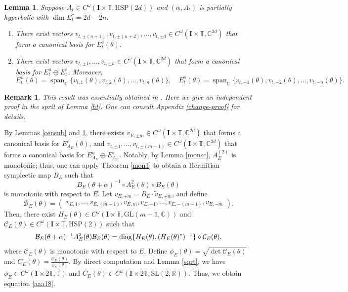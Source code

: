 \documentclass[11pt]{amsart}
\newtheorem{lemma}[theorem]{Lemma}
\newtheorem{rem}[theorem]{Remark}
\theoremstyle{remark}
\theoremstyle{definition}
\newcommand{\I}{{\mathbf I}}
\newcommand{\diag}{{\rm diag}}
\begin{document}
\begin{lemma}\label{change}  
Suppose \(A_t \in C^\omega(\I\times \mathbb{T}, \mathrm{HSP}(2d))\) and \((\alpha, A_t)\) is partially hyperbolic with \(\dim E_t^c = 2d - 2n\).  
\begin{enumerate}  
\item There exist vectors \(v_{t,\pm (n+1)}, v_{t,\pm (n+2)}, \dots, v_{t,\pm d} \in C^\omega(\I \times \mathbb{T}, \mathbb{C}^{2d})\) that form a canonical basis for \(E_t^c(\theta)\).  

\item There exist vectors \(v_{t,\pm 1}, \dots, v_{t,\pm n} \in C^\omega(\I\times \mathbb{T},\mathbb{C}^{2d})\) that form a canonical basis for \(E_t^u \oplus E_t^s\). Moreover,  
\[  
E_t^u(\theta) = \operatorname{span}_{\mathbb{C}}\{v_{t,1}(\theta), v_{t,2}(\theta), \dots, v_{t,n}(\theta)\}, \quad E_t^s(\theta) = \operatorname{span}_{\mathbb{C}}\{v_{t,-1}(\theta), v_{t,-2}(\theta), \dots, v_{t,-n}(\theta)\}.  
\]  
\end{enumerate}  
\end{lemma}
   

\begin{rem}
    This result was essentially obtained in  \cite[Proposition 5.2]{WXZ}. Here we give an independent proof in the sprit of Lemma \ref{ht}. One can consult Appendix \ref{change-proof} for details. 
\end{rem}

By Lemmas \ref{censub} and \ref{change}, there exists $\tilde{v}_{E,\pm m} \in C^\omega(\I \times \mathbb{T}, \mathbb{C}^{2d})$ that forms a canonical basis for $E_{A_E}^c(\theta)$, and $v_{t,\pm 1}, \dots, v_{t,\pm (m-1)} \in C^\omega(\I \times \mathbb{T}, \mathbb{C}^{2d})$ that forms a canonical basis for $E_{A_E}^u \oplus E_{A_E}^s$. Notably, by Lemma \ref{monsc}, $A_E^{(2)}$ is monotonic; thus, one can apply Theorem \ref{mon1} to obtain a Hermitian-symplectic map $B_E$ such that
$$
B_E(\theta+\alpha)^{-1} \circ A_E^2(\theta) \circ B_E(\theta)
$$
is monotonic with respect to $E$. Let $v_{E,\pm m} = B_E \cdot \tilde{v}_{E,\pm m}$, and define
$$
\mathcal{B}_E(\theta) = \begin{pmatrix}
v_{E, 1}, \dots, v_{E, (m-1)}, v_{E,m}, v_{E, -1}, \dots, v_{E, -(m-1)}, v_{E,-m}
\end{pmatrix}.
$$
Then, there exist $H_E(\theta) \in C^\omega(\I \times \mathbb{T}, \mathrm{GL}(m-1,\mathbb{C}))$ and $\mathcal{C}_E(\theta) \in C^{\omega}(\I \times \mathbb{T}, \mathrm{HSP}(2))$ such that
$$
\mathcal{B}_E(\theta+\alpha)^{-1} A_E^2(\theta) \mathcal{B}_E(\theta) = \diag\{H_E(\theta), (H_E(\theta)^*)^{-1}\} \diamond \mathcal{C}_E(\theta),
$$
where $\mathcal{C}_E(\theta)$ is monotonic with respect to $E$.
Define $\phi_E(\theta) = \sqrt{\det \mathcal{C}_E(\theta)}$ and $C_E(\theta) = \frac{\mathcal{C}_E(\theta)}{\phi_E(\theta)}$. By direct computation and Lemma \ref{sqrt}, we have $\phi_E \in C^\omega(\I \times 2\mathbb{T}, \mathbb{T})$ and $C_E(\theta) \in C^{\omega}(\I \times 2\mathbb{T}, \mathrm{SL}(2,\mathbb{R}))$. Thus, we obtain equation \eqref{aaa18}.
\end{document}
